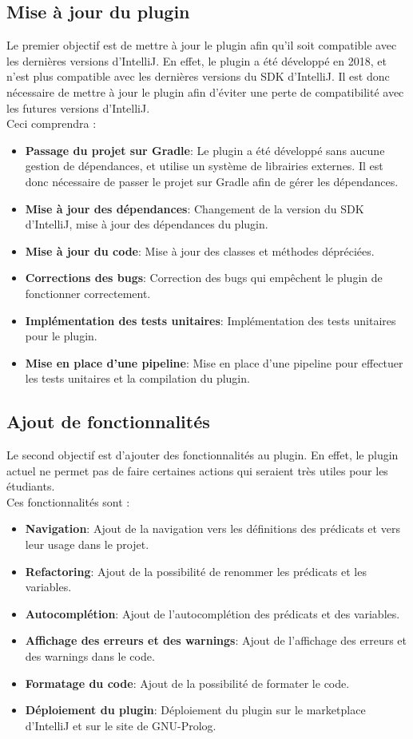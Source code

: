 \subsection{Mise à jour du plugin}
\noindent
Le premier objectif est de mettre à jour le plugin afin qu'il soit compatible avec les dernières versions d'IntelliJ. En effet, le plugin a été développé en 2018, et n'est plus compatible avec les dernières versions du SDK d'IntelliJ. Il est donc nécessaire de mettre à jour le plugin afin d'éviter une perte de compatibilité avec les futures versions d'IntelliJ.
\\ Ceci comprendra :
\begin{itemize}
    \item \textbf{Passage du projet sur Gradle}: Le plugin a été développé sans aucune gestion de dépendances, et utilise un système de librairies externes. Il est donc nécessaire de passer le projet sur Gradle afin de gérer les dépendances.
    \item \textbf{Mise à jour des dépendances}: Changement de la version du SDK d'IntelliJ, mise à jour des dépendances du plugin.
    \item \textbf{Mise à jour du code}: Mise à jour des classes et méthodes dépréciées.
    \item \textbf{Corrections des bugs}: Correction des bugs qui empêchent le plugin de fonctionner correctement.
    \item \textbf{Implémentation des tests unitaires}: Implémentation des tests unitaires pour le plugin.
    \item \textbf{Mise en place d'une pipeline}: Mise en place d'une pipeline pour effectuer les tests unitaires et la compilation du plugin.
\end{itemize}
\subsection{Ajout de fonctionnalités}
\noindent
Le second objectif est d'ajouter des fonctionnalités au plugin. En effet, le plugin actuel ne permet pas de faire certaines actions qui seraient très utiles pour les étudiants.
\\ Ces fonctionnalités sont :
\begin{itemize}
    \item \textbf{Navigation}: Ajout de la navigation vers les définitions des prédicats et vers leur usage dans le projet.
    \item \textbf{Refactoring}: Ajout de la possibilité de renommer les prédicats et les variables.
    \item \textbf{Autocomplétion}: Ajout de l'autocomplétion des prédicats et des variables.
    \item \textbf{Affichage des erreurs et des warnings}: Ajout de l'affichage des erreurs et des warnings dans le code.
    \item \textbf{Formatage du code}: Ajout de la possibilité de formater le code.
    \item \textbf{Déploiement du plugin}: Déploiement du plugin sur le marketplace d'IntelliJ et sur le site de GNU-Prolog.
\end{itemize}

